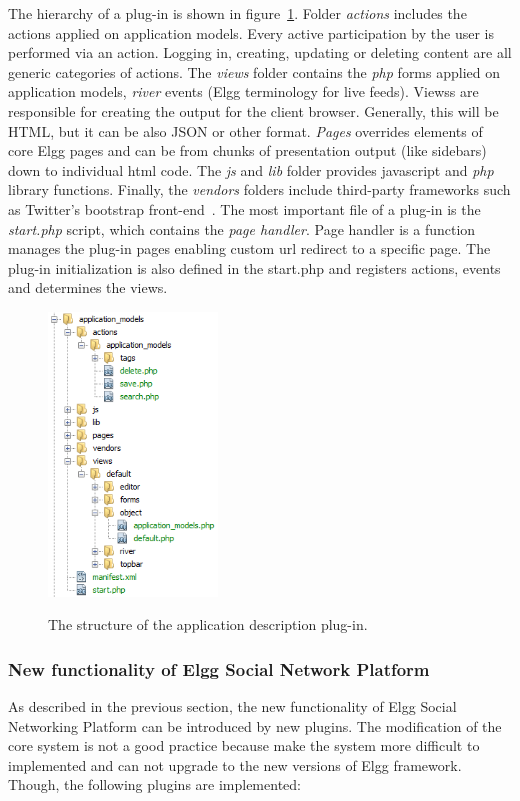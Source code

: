 The hierarchy of a plug-in is shown in figure~\ref{fig:elgg_hierarchy}. 
Folder {\em actions} includes the actions applied on application models. Every active participation by the user is performed via an action. Logging in, creating, updating or deleting content are all generic categories of actions.
The {\em views} folder contains the {\em php} forms applied on application models, {\em river} events (Elgg terminology for live feeds). Viewss are responsible for creating the output for the client browser. Generally, this will be HTML, but it can be also JSON or other format. 
{\em Pages} overrides elements of core Elgg pages and can be from chunks of presentation output (like sidebars) down to individual html code.  
The {\em js} and {\em lib} folder provides javascript and {\em php} library functions. 
Finally, the {\em vendors} folders include third-party frameworks such as Twitter's bootstrap front-end~\cite{bootstrap_url}.
The most important file of a plug-in is the \emph{start.php} script, which contains the \emph{page handler}. Page handler is a function manages the plug-in pages enabling custom url redirect to a specific page. 
The plug-in initialization is also defined in the start.php and registers actions, events and determines the views. 

\begin{figure}[h]
	\caption{The structure of the application description plug-in.}
	\includegraphics[width=0.4\textwidth]{./fig/folder_hierarchy.png}
	\centering
	\label{fig:elgg_hierarchy}
\end{figure}

\subsubsection{New functionality of Elgg Social Network Platform}
As described in the previous section, the new functionality of Elgg Social Networking Platform can be introduced by new plugins. The modification of the core system is not a good practice because make the system more difficult to implemented and can not upgrade to the new versions of Elgg framework. Though, the following plugins are implemented:

